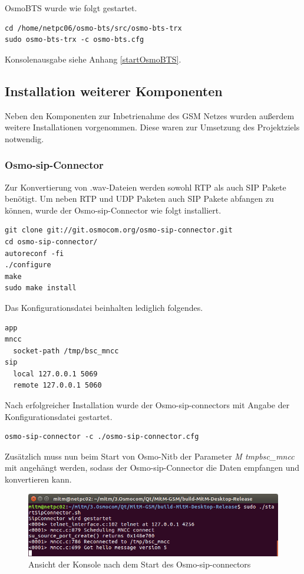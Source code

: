 \newpage
OsmoBTS wurde wie folgt gestartet.

\begin{lstlisting}
cd /home/netpc06/osmo-bts/src/osmo-bts-trx
sudo osmo-bts-trx -c osmo-bts.cfg
\end{lstlisting}
   \vspace{2mm}
   
Konsolenausgabe siehe Anhang \ref{startOsmoBTS}.


\subsection{Installation weiterer Komponenten}
Neben den Komponenten zur Inbetrienahme des GSM Netzes wurden außerdem weitere Installationen vorgenommen. Diese waren zur Umsetzung des Projektziels notwendig.

\subsubsection{Osmo-sip-Connector}
Zur Konvertierung von .wav-Dateien werden sowohl RTP als auch SIP Pakete benötigt. Um neben RTP und UDP Paketen auch SIP Pakete abfangen zu können, wurde der Osmo-sip-Connector wie folgt installiert.

\begin{lstlisting}
git clone git://git.osmocom.org/osmo-sip-connector.git
cd osmo-sip-connector/
autoreconf -fi
./configure
make
sudo make install
\end{lstlisting} 

Das Konfigurationsdatei beinhalten lediglich folgendes.

\begin{lstlisting}
app
mncc
  socket-path /tmp/bsc_mncc
sip
  local 127.0.0.1 5069
  remote 127.0.0.1 5060
\end{lstlisting}

Nach erfolgreicher Installation wurde der Osmo-sip-connectors mit Angabe der Konfigurationsdatei gestartet.

\begin{lstlisting}
osmo-sip-connector -c ./osmo-sip-connector.cfg
\end{lstlisting} 

Zusätzlich muss nun beim Start von Osmo-Nitb der Parameter \textit{\-M \/tmp\/bsc\_mncc} mit angehängt werden, sodass der Osmo-sip-Connector die Daten empfangen und konvertieren kann.

\begin{figure}[h] %
\centering
\includegraphics[width=15cm]{includes/Start_SipConnector}
\caption{Ansicht der Konsole nach dem Start des Osmo-sip-connectors}
\label{fig:Asterisk}
\end{figure}
 
